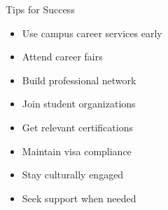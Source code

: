 \documentclass{beamer}
\begin{document}
\begin{frame}{Tips for Success}
\begin{itemize}
\item Use campus career services early
\item Attend career fairs
\item Build professional network
\item Join student organizations
\item Get relevant certifications
\item Maintain visa compliance
\item Stay culturally engaged
\item Seek support when needed
\end{itemize}
\end{frame}
\end{document}
